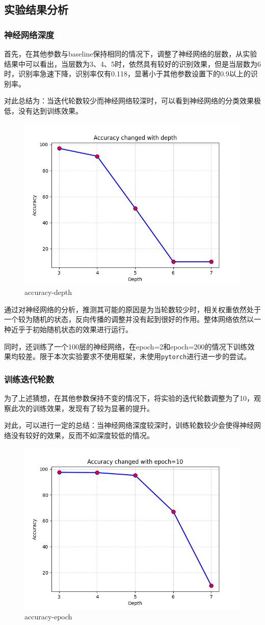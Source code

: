 \documentclass[12pt,a4paper]{article}
\begin{document}
\subsection{实验结果分析}

\subsubsection{神经网络深度}

首先，在其他参数与baseline保持相同的情况下，调整了神经网络的层数，从实验结果中可以看出，当层数为3、4、5时，依然具有较好的识别效果，但是当层数为6时，识别率急速下降，识别率仅有0.118，显著小于其他参数设置下的0.9以上的识别率。

对此总结为：当迭代轮数较少而神经网络较深时，可以看到神经网络的分类效果极低，没有达到训练效果。

\begin{figure}[htbp]
    \centering
    \includegraphics[width=0.5\linewidth]{img/accuracy-depth.png}
    \caption{accuracy-depth}
\end{figure} 

通过对神经网络的分析，推测其可能的原因是为当轮数较少时，相关权重依然处于一个较为随机的状态，反向传播的调整并没有起到很好的作用。整体网络依然以一种近乎于初始随机状态的效果进行运行。

同时，还训练了一个100层的神经网络，在epoch=2和epoch=200的情况下训练效果均较差。限于本次实验要求不使用框架，未使用\texttt{pytorch}进行进一步的尝试。

\subsubsection{训练迭代轮数}

为了上述猜想，在其他参数保持不变的情况下，将实验的迭代轮数调整为了10，观察此次的训练效果，发现有了较为显著的提升。

对此，可以进行一定的总结：当神经网络深度较深时，训练轮数较少会使得神经网络没有较好的效果，反而不如深度较低的情况。

\begin{figure}[htbp]
    \centering
    \includegraphics[width=0.5\linewidth]{img/accuracy-epoch.png}
    \caption{accuracy-epoch}
\end{figure} 
\end{document}
